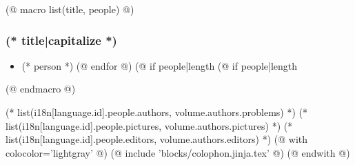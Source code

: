 (@ macro list(title, people) @)
    \subsubsection*{(* title|capitalize *)}
    \begin{multicols}{3}
        \begin{itemize}[label={}, itemsep=-1mm]
            (@ for person in people @)
                \item (* person *)
            (@ endfor @)
            (@ if people|length %
            (@ if people|length %
        \end{itemize}
    \end{multicols}
(@ endmacro @)

\vfill
{
    (* list(i18n[language.id].people.authors, volume.authors.problems) *)
    (* list(i18n[language.id].people.pictures, volume.authors.pictures) *)
    (* list(i18n[language.id].people.editors, volume.authors.editors) *)
    (@ with colocolor='lightgray' @)
        (@ include 'blocks/colophon.jinja.tex' @)
    (@ endwith @)
}
